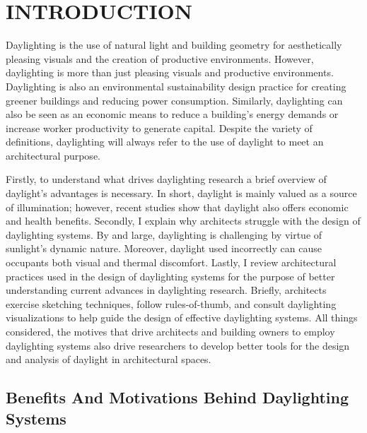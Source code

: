 
\chapter{INTRODUCTION} \label{sec:introduction}

Daylighting is the use of natural light and building geometry for aesthetically pleasing visuals and the creation of productive environments.
However, daylighting is more than just pleasing visuals and productive environments.
Daylighting is also an environmental sustainability design practice for creating greener buildings and reducing power consumption. %
Similarly, daylighting can also be seen as an  economic means to reduce a building's energy demands or increase worker productivity to generate capital. %
Despite the variety of definitions, daylighting will always refer to the use of daylight to meet an architectural purpose. %

Firstly, to understand what drives daylighting research a brief overview of daylight's advantages is necessary.
In short, daylight is mainly valued as a source of illumination; however, recent studies show that daylight also offers economic and health benefits.
Secondly, I explain why architects struggle with the design of daylighting systems.
By and large, daylighting is challenging by virtue of sunlight's dynamic nature.
Moreover, daylight used incorrectly can cause occupants both visual and thermal discomfort.
%
Lastly, I review architectural practices used in the design of daylighting systems for the purpose of better understanding current advances in daylighting research.
Briefly, architects exercise sketching techniques, follow rules-of-thumb, and consult daylighting visualizations to help guide the design of effective daylighting systems. 
%
All things considered, the motives that drive architects and building owners to employ daylighting systems also drive researchers to develop better tools for the design and analysis of daylight in architectural spaces.\\

\section{Benefits And Motivations Behind Daylighting Systems}
    
